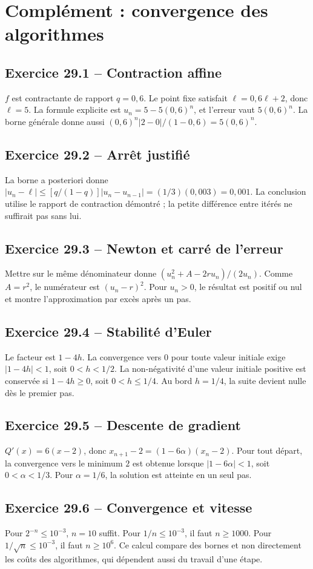 \chapter{Complément : convergence des algorithmes}
\section*{Exercice 29.1 -- Contraction affine}
$f$ est contractante de rapport $q=0{,}6$. Le point fixe satisfait $\ell=0{,}6\ell+2$, donc $\ell=5$. La formule explicite est $u_n=5-5(0{,}6)^n$, et l'erreur vaut $5(0{,}6)^n$. La borne générale donne aussi $(0{,}6)^n|2-0|/(1-0{,}6)=5(0{,}6)^n$.

\section*{Exercice 29.2 -- Arrêt justifié}
La borne a posteriori donne $|u_n-\ell|\le[q/(1-q)]|u_n-u_{n-1}|=(1/3)(0{,}003)=0{,}001$. La conclusion utilise le rapport de contraction démontré ; la petite différence entre itérés ne suffirait pas sans lui.

\section*{Exercice 29.3 -- Newton et carré de l'erreur}
Mettre sur le même dénominateur donne $(u_n^2+A-2ru_n)/(2u_n)$. Comme $A=r^2$, le numérateur est $(u_n-r)^2$. Pour $u_n>0$, le résultat est positif ou nul et montre l'approximation par excès après un pas.

\section*{Exercice 29.4 -- Stabilité d'Euler}
Le facteur est $1-4h$. La convergence vers $0$ pour toute valeur initiale exige $|1-4h|<1$, soit $0<h<1/2$. La non-négativité d'une valeur initiale positive est conservée si $1-4h\ge0$, soit $0<h\le1/4$. Au bord $h=1/4$, la suite devient nulle dès le premier pas.

\section*{Exercice 29.5 -- Descente de gradient}
$Q'(x)=6(x-2)$, donc $x_{n+1}-2=(1-6\alpha)(x_n-2)$. Pour tout départ, la convergence vers le minimum $2$ est obtenue lorsque $|1-6\alpha|<1$, soit $0<\alpha<1/3$. Pour $\alpha=1/6$, la solution est atteinte en un seul pas.

\section*{Exercice 29.6 -- Convergence et vitesse}
Pour $2^{-n}\le10^{-3}$, $n=10$ suffit. Pour $1/n\le10^{-3}$, il faut $n\ge1000$. Pour $1/\sqrt n\le10^{-3}$, il faut $n\ge10^6$. Ce calcul compare des bornes et non directement les coûts des algorithmes, qui dépendent aussi du travail d'une étape.

